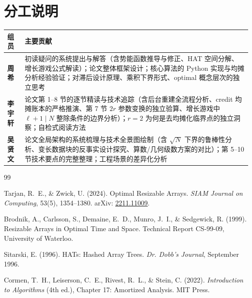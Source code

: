 \documentclass[12pt,a4paper]{ctexart}
\begin{document}
\section{分工说明}

\begin{table}[htbp]
\centering
\begin{tabular}{@{}>{\bfseries}l>{\raggedright\arraybackslash}p{10cm}@{}}
\toprule
组员 & 主要贡献 \\
\midrule
周希 & 初读疑问的系统提出与解答（含势能函数推导与修正、HAT 空间分解、增长游戏公式解读）；论文整体框架设计；核心算法的 Python 实现与均摊分析经验验证；对滞后设计原理、乘积下界形式、optimal 概念层次的独立思考 \\
\midrule
李宇轩 & 论文第 1–8 节的逐节精读与技术追踪（含后台重建全流程分析、credit 均摊账本的严格推演、第 7 节 $2r$ 参数变换的独立验算、增长游戏中 $\ell+1 \mid N$ 整除条件的边界分析）；$r=2$ 为何是去均摊化临界点的独立洞察；自检式阅读方法 \\
\midrule
吴贤文 & 论文全局架构的系统梳理与技术全景图绘制（含 $\sqrt{N}$ 下界的鲁棒性分析、变长数据块的反事实设计探究、算数/几何级数方案的对比）；第 5–10 节技术要点的完整整理；工程场景的差异化分析 \\
\bottomrule
\end{tabular}
\end{table}

\begin{thebibliography}{99}

Tarjan, R.~E., \& Zwick, U. (2024).
Optimal Resizable Arrays.
\textit{SIAM Journal on Computing}, 53(5), 1354–1380.
arXiv: \href{https://arxiv.org/abs/2211.11009}{2211.11009}.

Brodnik, A., Carlsson, S., Demaine, E.~D., Munro, J.~I., \& Sedgewick, R. (1999).
Resizable Arrays in Optimal Time and Space.
Technical Report CS-99-09, University of Waterloo.

Sitarski, E. (1996).
HATs: Hashed Array Trees.
\textit{Dr. Dobb's Journal}, September 1996.

Cormen, T.~H., Leiserson, C.~E., Rivest, R.~L., \& Stein, C. (2022).
\textit{Introduction to Algorithms} (4th ed.), Chapter 17: Amortized Analysis.
MIT Press.

\end{thebibliography}
\end{document}
